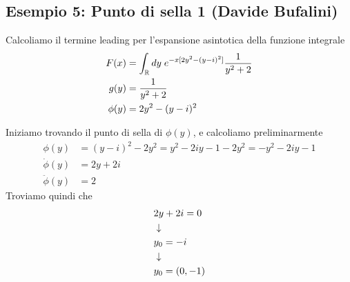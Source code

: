 \newpage



\subsection{Esempio 5: Punto di sella 1 (Davide Bufalini)}

Calcoliamo il termine leading per l'espansione asintotica  della funzione integrale
\begin{align}
	F(x) &= \int_{\mathbb{R}} dy \; e^{-x[2y^2 -(y-i)^2]} \frac{1}{y^2 + 2}\\
	g(y) &=  \frac{1}{y^2 + 2}\\
	\phi(y) &= 2y^2 -(y-i)^2
\end{align}

Iniziamo trovando il punto di sella di $\phi(y)$, e calcoliamo preliminarmente
\begin{align}
	\phi(y) &=  (y-i)^2 -2y^2 = y^2 - 2iy -1 -2y^2 = -y^2 - 2iy -1 \\
	\dot{\phi}(y) &= 2y + 2i\\
	\ddot{\phi}(y) &= 2
\end{align}
Troviamo quindi che
\begin{align}
	&2y + 2i = 0 \\ &\downarrow \nonumber \\
	&y_0=-i\\ &\downarrow \nonumber \\
	&y_0= (0,-1)
\end{align}

